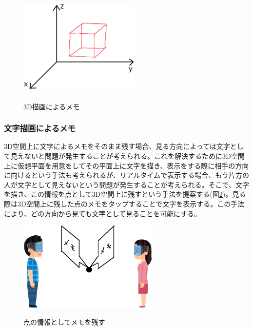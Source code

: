 \documentclass{hissymp}
\begin{document}
\begin{figure}[h]
  \begin{center}
    \includegraphics[clip,height=5.0cm,width=6.0cm]{./3d_draw.eps}
    \caption{3D描画によるメモ}
    \label{fig:3d_draw}
  \end{center}
\end{figure}

\subsubsection{文字描画によるメモ}
3D空間上に文字によるメモをそのまま残す場合、見る方向によっては文字として見えないと問題が発生することが考えられる。これを解決するために3D空間上に仮想平面を用意をしてその平面上に文字を描き、表示をする際に相手の方向に向けるという手法も考えられるが、リアルタイムで表示する場合、もう片方の人が文字として見えないという問題が発生することが考えられる。そこで、文字を描き、この情報を点として3D空間上に残すという手法を提案する(図\ref{fig:tennomemo})。見る際は3D空間上に残した点のメモをタップすることで文字を表示する。この手法により、どの方向から見ても文字として見ることを可能にする。

\begin{figure}[h]
  \begin{center}
    \includegraphics[clip,width=7.0cm]{./tennomemo.eps}
    \caption{点の情報としてメモを残す}
    \label{fig:tennomemo}
  \end{center}
\end{figure}
\end{document}

